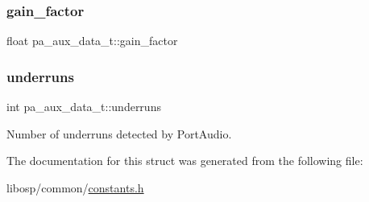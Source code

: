 \mbox{\label{structpa__aux__data__t_a6410c0b0f5f07c5cd64f0ca85afc825b}} 
\subsubsection{\texorpdfstring{gain\+\_\+factor}{gain\_factor}}
{\footnotesize\ttfamily float pa\+\_\+aux\+\_\+data\+\_\+t\+::gain\+\_\+factor}

\mbox{\label{structpa__aux__data__t_aa3d43d6df6b87e7486d549985762081b}} 
\subsubsection{\texorpdfstring{underruns}{underruns}}
{\footnotesize\ttfamily int pa\+\_\+aux\+\_\+data\+\_\+t\+::underruns}



Number of underruns detected by Port\+Audio. 



The documentation for this struct was generated from the following file\+:\begin{DoxyCompactItemize}
\item 
libosp/common/\mbox{\hyperlink{constants_8h}{constants.\+h}}\end{DoxyCompactItemize}
